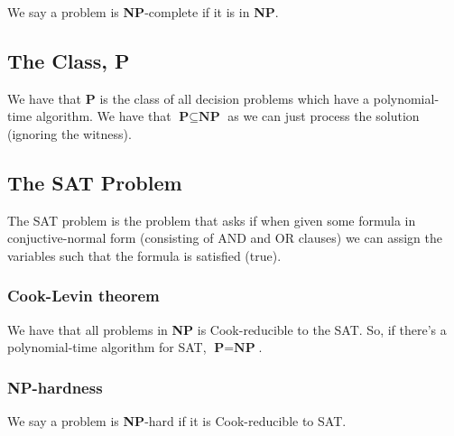 \documentclass[a4paper, 12pt, twoside]{article}
\begin{document}
We say a problem is \textbf{NP}-complete if it is in \textbf{NP}.

\subsection{The Class, \textbf{P}}

We have that \textbf{P} is the class of all decision problems which have a polynomial-time
algorithm. We have that $\textbf{P} \subseteq \textbf{NP}$ as we can just process the solution
(ignoring the witness).

\subsection{The SAT Problem}

The SAT problem is the problem that asks if when given some formula in conjuctive-normal form
(consisting of AND and OR clauses) we can assign the variables such that the formula is 
satisfied (true).

\subsubsection{Cook-Levin theorem}

We have that all problems in \textbf{NP} is Cook-reducible to the SAT. So, if there's
a polynomial-time algorithm for SAT, $\textbf{P} = \textbf{NP}$.

\subsubsection{\textbf{NP}-hardness}

We say a problem is \textbf{NP}-hard if it is Cook-reducible to SAT.
\end{document}
